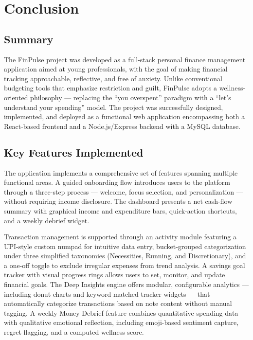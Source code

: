 \chapter{Conclusion}

\section{Summary}

The FinPulse project was developed as a full-stack personal finance management application aimed at young professionals, with the goal of making financial tracking approachable, reflective, and free of anxiety. Unlike conventional budgeting tools that emphasize restriction and guilt, FinPulse adopts a wellness-oriented philosophy — replacing the ``you overspent'' paradigm with a ``let's understand your spending'' model. The project was successfully designed, implemented, and deployed as a functional web application encompassing both a React-based frontend and a Node.js/Express backend with a MySQL database.

\section{Key Features Implemented}

The application implements a comprehensive set of features spanning multiple functional areas. A guided onboarding flow introduces users to the platform through a three-step process — welcome, focus selection, and personalization — without requiring income disclosure. The dashboard presents a net cash-flow summary with graphical income and expenditure bars, quick-action shortcuts, and a weekly debrief widget.

Transaction management is supported through an activity module featuring a UPI-style custom numpad for intuitive data entry, bucket-grouped categorization under three simplified taxonomies (Necessities, Running, and Discretionary), and a one-off toggle to exclude irregular expenses from trend analysis. A savings goal tracker with visual progress rings allows users to set, monitor, and update financial goals. The Deep Insights engine offers modular, configurable analytics — including donut charts and keyword-matched tracker widgets — that automatically categorize transactions based on note content without manual tagging. A weekly Money Debrief feature combines quantitative spending data with qualitative emotional reflection, including emoji-based sentiment capture, regret flagging, and a computed wellness score.


